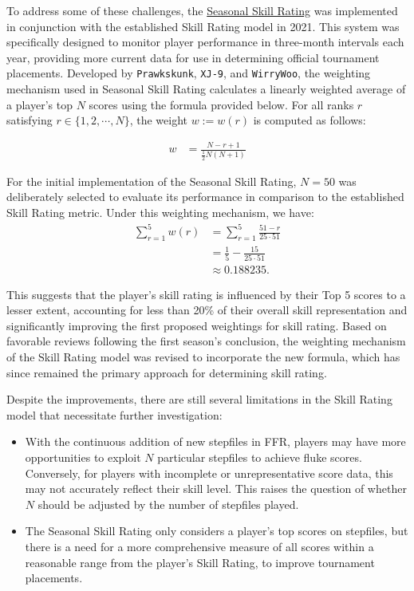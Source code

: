 \vspace{2mm}

To address some of these challenges, the  \href{https://www.flashflashrevolution.com/ffr/season-1/}{Seasonal Skill Rating} was implemented in conjunction with the established Skill Rating model in 2021. This system was specifically designed to monitor player performance in three-month intervals each year, providing more current data for use in determining official tournament placements. Developed by \texttt{Prawkskunk}, \texttt{XJ-9}, and \texttt{WirryWoo}, the weighting mechanism used in Seasonal Skill Rating calculates a linearly weighted average of a player's top $N$ scores using the formula provided below. For all ranks $r$ satisfying $r \in \{1, 2, \cdots, N\}$, the weight $w := w(r)$ is computed as follows:

\begin{align*}
	w & = \frac{N - r + 1}{\frac{1}{2}N (N + 1)} 
\end{align*}


For the initial implementation of the Seasonal Skill Rating, $N = 50$ was deliberately selected to evaluate its performance in comparison to the established Skill Rating metric. Under this weighting mechanism, we have:
\begin{align*}
	\sum_{r = 1}^5 w(r) & = \displaystyle \sum_{r = 1}^5 \frac{51 - r}{25 \cdot 51} \\
  &= \frac{1}{5} - \frac{15}{25 \cdot 51}\\
  &\approx 0.188235.
\end{align*}

This suggests that the player's skill rating is influenced by their Top 5 scores to a lesser extent, accounting for less than 20\% of their overall skill representation and significantly improving the first proposed weightings for skill rating. Based on favorable reviews following the first season's conclusion, the weighting mechanism of the Skill Rating model was revised to incorporate the new formula, which has since remained the primary approach for determining skill rating.
\vspace{2mm}

Despite the improvements, there are still several limitations in the Skill Rating model that necessitate further investigation: 
\begin{itemize}
	\item With the continuous addition of new stepfiles in FFR, players may have more opportunities to exploit $N$ particular stepfiles to achieve fluke scores. Conversely, for players with incomplete or unrepresentative score data, this may not accurately reflect their skill level. This raises the question of whether $N$ should be adjusted by the number of stepfiles played.
	\item The Seasonal Skill Rating only considers a player's top scores on stepfiles, but there is a need for a more comprehensive measure of all scores within a reasonable range from the player's Skill Rating, to improve tournament placements.
	      
\end{itemize}

